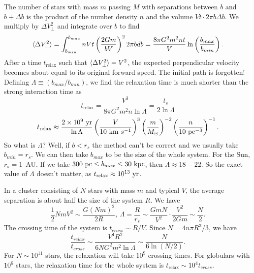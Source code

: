 \documentclass[]{article}
\begin{document}
The number of stars with mass $m$ passing $M$ with
separations between $b$ and $b+\Delta b$ is the product of
the number density $n$ and the volume $V t \cdot 2 \pi b\Delta b$.
We multiply by $\Delta V_{\perp}^{2}$ and integrate over $b$ to find
\begin{equation}
\langle\Delta V_{\perp}^{2}\rangle = \int_{b_{min}}^{b_{max}} n V t\left(\frac{2Gm}{bV}\right)^2 2 \pi b db = \frac{8 \pi G^2 m^2 nt}{V} \ln \left(\frac{b_{max}}{b_{min}}\right).
\end{equation}
\noindent
After a time $t_{\mathrm{relax}}$ such that $\langle\Delta V_{\perp}^2\rangle = V^2$, the expected perpendicular 
velocity becomes about equal to its original forward speed.  The initial path is forgotten!
Defining $\Lambda\equiv (b_{max}/b_{min})$, we find the relaxation time is much shorter than
the strong interaction time as
\begin{equation}
t_{\mathrm{relax}} = \frac{V^3}{8\pi G^2 m^2 n \ln \Lambda} = \frac{t_s}{2 \ln \Lambda}
\end{equation}
\begin{equation}
t_{\mathrm{relax}} \approx \frac{2\times10^9~\mathrm{yr}}{\ln \Lambda}\left(\frac{V}{10~\mathrm{km}~s^{-1}}\right)^3\left(\frac{m}{M_{\odot}}\right)^{-2}\left(\frac{n}{10~\mathrm{pc}^{-3}}\right)^{-1}.
\end{equation}
\noindent
So what is $\Lambda$?  Well, if $b<r_s$ the method can't be correct and we usually take $b_{min} = r_s$.  We
can then take $b_{max}$ to be the size of the whole system.  For the Sun, $r_s = 1$~AU.  If we 
take $300~\mathrm{pc} \leq b_{max} \leq 30~\mathrm{kpc}$, then $\Lambda\approx18-22$.  So the exact value of
$\Lambda$ doesn't matter, as $t_{\mathrm{relax}}\approx10^{13}~\mathrm{yr}$.

In a cluster consisting of $N$ stars with mass $m$ and typical $V$, the average separation is about
half the size of the system $R$.  We have
\begin{equation}
\frac{1}{2}NmV^2 \sim \frac{G(Nm)^2}{2R},~\Lambda = \frac{R}{r_s} \sim \frac{GmN}{V^2} \cdot \frac{V^2}{2Gm}\sim\frac{N}{2}.
\end{equation}
The crossing time of the system is $t_{cross} \sim R/V$.  Since $N=4n\pi R^3 /3$, we have
\begin{equation}
\frac{t_{relax}}{t_{cross}} \sim \frac{V^4 R^2}{6 N G^2 m^2 \ln \Lambda} \sim \frac{N}{6 \ln (N/2)}.
\end{equation}
\noindent
For $N\sim10^{11}$ stars, the relaxation will take $10^9$ crossing times.  For globulars with $10^6$ stars,
the relaxation time for the whole system is $t_{\mathrm{relax}} \sim 10^4 t_{cross}$.
\end{document}
